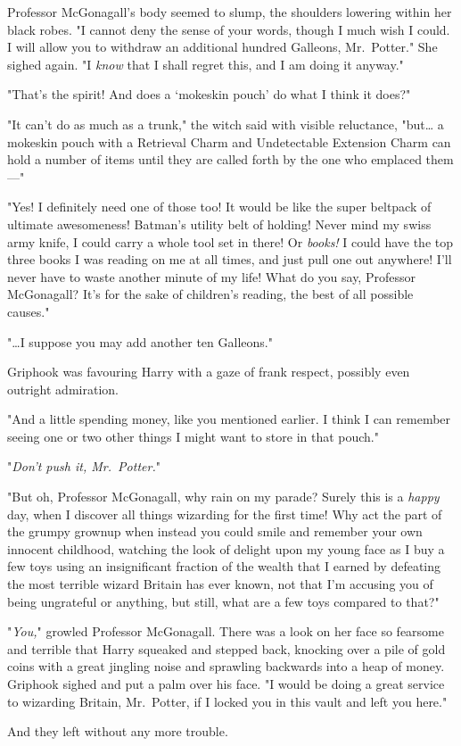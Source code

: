 Professor McGonagall's body seemed to slump, the shoulders lowering within her 
black robes. "I cannot deny the sense of your words, though I much wish I 
could. I will allow you to withdraw an additional hundred Galleons, 
Mr.~Potter." She sighed again. "I \emph{know} that I shall regret this, and I 
am doing it anyway."

"That's the spirit! And does a `mokeskin pouch' do what I think it does?"

"It can't do as much as a trunk," the witch said with visible reluctance, 
"but{\ldots} a mokeskin pouch with a Retrieval Charm and Undetectable Extension 
Charm can hold a number of items until they are called forth by the one who 
emplaced them---"

"Yes! I definitely need one of those too! It would be like the super beltpack 
of ultimate awesomeness! Batman's utility belt of holding! Never mind my swiss 
army knife, I could carry a whole tool set in there! Or \emph{books!} I could 
have the top three books I was reading on me at all times, and just pull one 
out anywhere! I'll never have to waste another minute of my life! What do you 
say, Professor McGonagall? It's for the sake of children's reading, the best of 
all possible causes."

"{\ldots}I suppose you may add another ten Galleons."

Griphook was favouring Harry with a gaze of frank respect, possibly even 
outright admiration.

"And a little spending money, like you mentioned earlier. I think I can 
remember seeing one or two other things I might want to store in that pouch."

"\emph{Don't push it, Mr.~Potter.}"

"But oh, Professor McGonagall, why rain on my parade? Surely this is a 
\emph{happy} day, when I discover all things wizarding for the first time! Why 
act the part of the grumpy grownup when instead you could smile and remember 
your own innocent childhood, watching the look of delight upon my young face as 
I buy a few toys using an insignificant fraction of the wealth that I earned by 
defeating the most terrible wizard Britain has ever known, not that I'm 
accusing you of being ungrateful or anything, but still, what are a few toys 
compared to that?"

"\emph{You,}" growled Professor McGonagall. There was a look on her face so 
fearsome and terrible that Harry squeaked and stepped back, knocking over a 
pile of gold coins with a great jingling noise and sprawling backwards into a 
heap of money. Griphook sighed and put a palm over his face. "I would be doing 
a great service to wizarding Britain, Mr.~Potter, if I locked you in this vault 
and left you here."

And they left without any more trouble.
